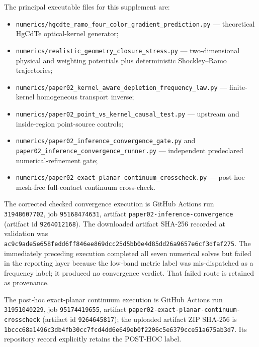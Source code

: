 \documentclass[aps,pra,onecolumn,superscriptaddress,nofootinbib]{revtex4-2}
\begin{document}
The principal executable files for this supplement are:
\begin{itemize}
\item \texttt{numerics/hgcdte\_ramo\_four\_color\_gradient\_prediction.py} --- theoretical HgCdTe optical-kernel generator;
\item \texttt{numerics/realistic\_geometry\_closure\_stress.py} --- two-dimensional physical and weighting potentials plus deterministic Shockley--Ramo trajectories;
\item \texttt{numerics/paper02\_kernel\_aware\_depletion\_frequency\_law.py} --- finite-kernel homogeneous transport inverse;
\item \texttt{numerics/paper02\_point\_vs\_kernel\_causal\_test.py} --- upstream and inside-region point-source controls;
\item \texttt{numerics/paper02\_inference\_convergence\_gate.py} and \texttt{paper02\_inference\_convergence\_runner.py} --- independent predeclared numerical-refinement gate;
\item \texttt{numerics/paper02\_exact\_planar\_continuum\_crosscheck.py} --- post-hoc mesh-free full-contact continuum cross-check.
\end{itemize}

The corrected checked convergence execution is GitHub Actions run \texttt{31948607702}, job \texttt{95168474631}, artifact \texttt{paper02-inference-convergence} (artifact id \texttt{9264012168}).  The downloaded artifact SHA-256 recorded at validation was \texttt{ac9c9ade5e658fedd6ff846ee869dcc25d5bb0e4d85dd26a9657e6cf3dfaf275}.  The immediately preceding execution completed all seven numerical solves but failed in the reporting layer because the low-band metric label was mis-dispatched as a frequency label; it produced no convergence verdict.  That failed route is retained as provenance.

The post-hoc exact-planar continuum execution is GitHub Actions run \texttt{31951040229}, job \texttt{95174419655}, artifact \texttt{paper02-exact-planar-continuum-crosscheck} (artifact id \texttt{9264645817}); the uploaded artifact ZIP SHA-256 is \texttt{1bccc68a1496c3db4fb30cc7fcd4dd6e649eb0f2206c5e6379cce51a675ab3d7}.  Its repository record explicitly retains the POST-HOC label.



\end{document}
